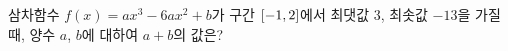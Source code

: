 삼차함수 $f(x)=ax^3-6ax^2+b$가 구간 $[-1{,}\mkern3mu\mathopen{}2]$에서 최댓값 $3$, 최솟값 $-13$을 가질 때, 양수 $a$, $b$에 대하여 $a+b$의 값은?
